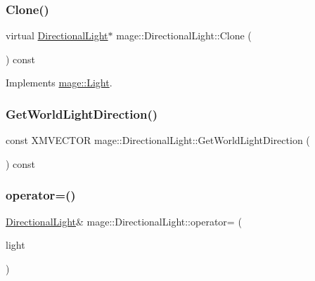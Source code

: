 \subsubsection{\texorpdfstring{Clone()}{Clone()}}
{\footnotesize\ttfamily virtual \hyperlink{classmage_1_1_directional_light}{Directional\+Light}$\ast$ mage\+::\+Directional\+Light\+::\+Clone (\begin{DoxyParamCaption}{ }\end{DoxyParamCaption}) const\hspace{0.3cm}{\ttfamily [virtual]}}



Implements \hyperlink{classmage_1_1_light_aada77583072dd108e5cf86257225b768}{mage\+::\+Light}.

\hypertarget{classmage_1_1_directional_light_a0ae6286a6058bc22f7fdcea6b87e5c43}{}\label{classmage_1_1_directional_light_a0ae6286a6058bc22f7fdcea6b87e5c43} 
\subsubsection{\texorpdfstring{Get\+World\+Light\+Direction()}{GetWorldLightDirection()}}
{\footnotesize\ttfamily const X\+M\+V\+E\+C\+T\+OR mage\+::\+Directional\+Light\+::\+Get\+World\+Light\+Direction (\begin{DoxyParamCaption}{ }\end{DoxyParamCaption}) const}

\hypertarget{classmage_1_1_directional_light_a4cdc2d83e56d92720f9af12a1a3801a1}{}\label{classmage_1_1_directional_light_a4cdc2d83e56d92720f9af12a1a3801a1} 
\subsubsection{\texorpdfstring{operator=()}{operator=()}\hspace{0.1cm}{\footnotesize\ttfamily [1/2]}}
{\footnotesize\ttfamily \hyperlink{classmage_1_1_directional_light}{Directional\+Light}\& mage\+::\+Directional\+Light\+::operator= (\begin{DoxyParamCaption}\item[{const \hyperlink{classmage_1_1_directional_light}{Directional\+Light} \&}]{light }\end{DoxyParamCaption})\hspace{0.3cm}{\ttfamily [default]}}

